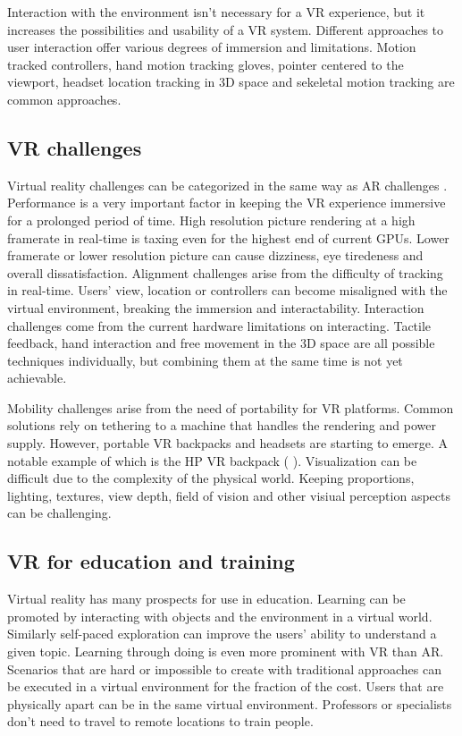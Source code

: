 \documentclass[12pt, a4paper,oneside, nocenter]{thesis}
\newcommand{\citeyeartitlexamkinline}[1]{(\usebibentry{#1}{title} \citeyear{#1})}
\begin{document}
\par
Interaction with the environment isn't necessary for a VR experience, but it increases the possibilities and usability of a VR system.
Different approaches to user interaction offer various degrees of immersion and limitations. Motion tracked controllers, hand motion tracking gloves, pointer centered to the viewport, headset location tracking in 3D space and sekeletal motion tracking are common approaches.
\subsection{VR challenges}
Virtual reality challenges can be categorized in the same way as AR challenges .
Performance is a very important factor in keeping the VR experience immersive for a prolonged period of time.
High resolution picture rendering at a high framerate in real-time is taxing even for the highest end of current GPUs. 
Lower framerate or lower resolution picture can cause dizziness, eye tiredeness and overall dissatisfaction. Alignment challenges arise from the difficulty of tracking in real-time.
Users' view, location or controllers can become misaligned with the virtual environment, breaking the immersion and interactability.
Interaction challenges come from the current hardware limitations on interacting. Tactile feedback, hand interaction and free movement in the 3D space are all possible techniques individually, but combining them at the same time is not yet achievable.
\par %
Mobility challenges arise from the need of portability for VR platforms. Common solutions
rely on tethering to a machine that handles the rendering and power supply. However, portable VR backpacks and headsets are starting to emerge. A notable example of which is the HP VR backpack \citeyeartitlexamkinline{hp-vrbackpack}.
Visualization can be difficult due to the complexity of the physical world. Keeping proportions, lighting, textures, view depth, field of vision and other visiual perception aspects can be challenging.
\subsection{VR for education and training}
Virtual reality has many prospects for use in education. Learning can be promoted by interacting with objects and the environment in a virtual world. 
Similarly self-paced exploration can improve the users' ability to understand a given topic.
Learning through doing is even more prominent with VR than AR. Scenarios that are hard or impossible to create with traditional approaches can be executed in a virtual environment for the fraction of the cost.
Users that are physically apart can be in the same virtual environment.
Professors or specialists don't need to travel to remote locations to train people.
\end{document}
